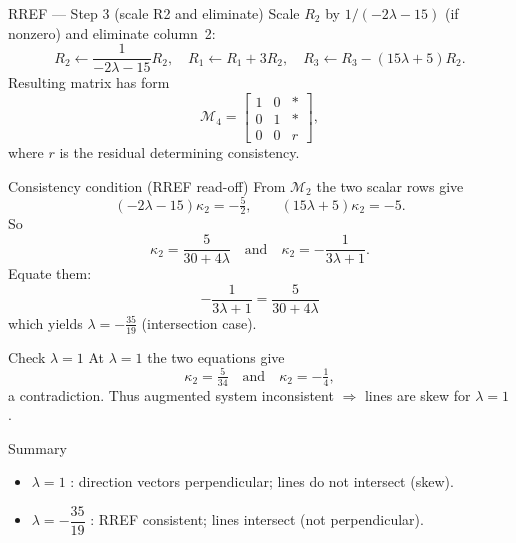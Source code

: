 \documentclass{beamer}
\begin{document}
\begin{frame}{RREF — Step 3 (scale R2 and eliminate)}
Scale \(R_2\) by \(1/(-2\lambda-15)\) (if nonzero) and eliminate column~2:
\[
R_2\leftarrow \frac{1}{-2\lambda-15}R_2,\quad
R_1\leftarrow R_1+3R_2,\quad
R_3\leftarrow R_3-(15\lambda+5)R_2.
\]
Resulting matrix has form
\[
\mathcal{M}_4 =
\left[\begin{array}{cc|c}
1 & 0 & * \\
0 & 1 & * \\
0 & 0 & r
\end{array}\right],
\]
where \(r\) is the residual determining consistency.
\end{frame}

\begin{frame}{Consistency condition (RREF read-off)}
From \(\mathcal{M}_2\) the two scalar rows give
\[
(-2\lambda-15)\kappa_2=-\tfrac{5}{2},\qquad (15\lambda+5)\kappa_2=-5.
\]
So
\[
\kappa_2=\frac{5}{30+4\lambda} \quad\text{and}\quad
\kappa_2=-\frac{1}{3\lambda+1}.
\]
Equate them:
\[
-\frac{1}{3\lambda+1}=\frac{5}{30+4\lambda}
\]
which yields \(\boxed{\lambda=-\tfrac{35}{19}}\) (intersection case).
\end{frame}

\begin{frame}{Check \(\lambda=1\)}
At \(\lambda=1\) the two equations give
\[
\kappa_2=\tfrac{5}{34}\quad\text{and}\quad \kappa_2=-\tfrac{1}{4},
\]
a contradiction. Thus augmented system inconsistent \(\Rightarrow\) lines are skew for \(\lambda=1\).
\end{frame}

\begin{frame}{Summary}
\begin{itemize}
\item \(\lambda=1\) : direction vectors perpendicular; lines do not intersect (skew).
\item \(\lambda=-\dfrac{35}{19}\) : RREF consistent; lines intersect (not perpendicular).
\end{itemize}
\end{frame}
\end{document}
